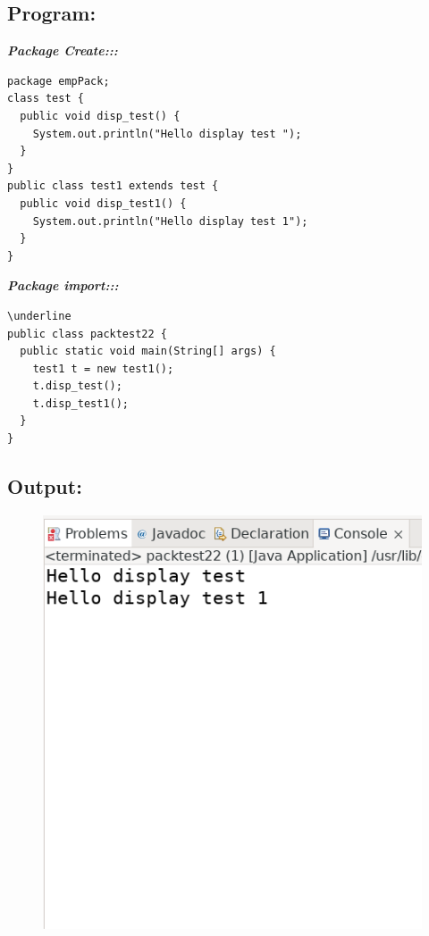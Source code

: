 \documentclass[12pt, a4paper]{article}
\begin{document}
\subsection*{Program:}

\emph{\textbf{Package Create:::}}

\begin{lstlisting}
package empPack;
class test {
  public void disp_test() {
    System.out.println("Hello display test ");
  }
}
public class test1 extends test {
  public void disp_test1() {
    System.out.println("Hello display test 1");
  }
}
\end{lstlisting}

\emph{\textbf{Package import:::}}
\begin{lstlisting}
\underline
public class packtest22 {
  public static void main(String[] args) {
    test1 t = new test1();
    t.disp_test();
    t.disp_test1();
  }
}
\end{lstlisting}

\subsection*{Output:}
\begin{figure}[h]
  \centering
  \includegraphics[width=\textwidth]{empPack}
\end{figure}
\newpage
\end{document}
